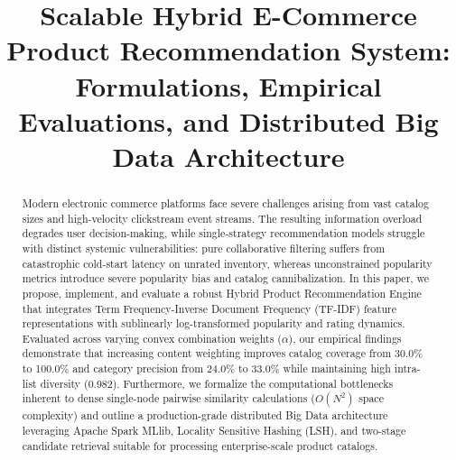 \documentclass[conference]{IEEEtran}
\begin{document}
\title{Scalable Hybrid E-Commerce Product Recommendation System: Formulations, Empirical Evaluations, and Distributed Big Data Architecture}

\author{
\and
{}
}

\maketitle

\begin{abstract}
Modern electronic commerce platforms face severe challenges arising from vast catalog sizes and high-velocity clickstream event streams. The resulting information overload degrades user decision-making, while single-strategy recommendation models struggle with distinct systemic vulnerabilities: pure collaborative filtering suffers from catastrophic cold-start latency on unrated inventory, whereas unconstrained popularity metrics introduce severe popularity bias and catalog cannibalization. In this paper, we propose, implement, and evaluate a robust Hybrid Product Recommendation Engine that integrates Term Frequency-Inverse Document Frequency (TF-IDF) feature representations with sublinearly log-transformed popularity and rating dynamics. Evaluated across varying convex combination weights ($\alpha$), our empirical findings demonstrate that increasing content weighting improves catalog coverage from 30.0\% to 100.0\% and category precision from 24.0\% to 33.0\% while maintaining high intra-list diversity (0.982). Furthermore, we formalize the computational bottlenecks inherent to dense single-node pairwise similarity calculations ($O(N^2)$ space complexity) and outline a production-grade distributed Big Data architecture leveraging Apache Spark MLlib, Locality Sensitive Hashing (LSH), and two-stage candidate retrieval suitable for processing enterprise-scale product catalogs.
\end{abstract}
\end{document}

